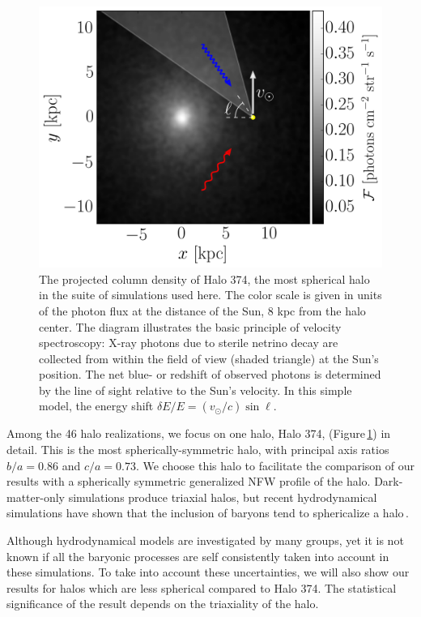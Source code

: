 \documentclass[aps,prd,10pt,twocolumn,superscriptaddress,showpacs]{revtex4-1}
\begin{document}
\begin{figure}[h!]
\centering
\includegraphics[width=0.99\columnwidth]{vspec_diagram.png}
\caption{The projected column density of Halo 374, the most spherical halo in the suite of
	simulations used here. The color scale is given in units of the photon flux at
the distance of the Sun, 8 kpc from the halo center. The diagram illustrates the basic principle of velocity
spectroscopy: X-ray photons due to sterile netrino decay are collected from within the field
of view (shaded triangle) at the Sun's position. The net blue- or redshift of observed photons 
is determined by the line of sight relative to the Sun's velocity. In this simple model, the energy
shift $\delta E/E=(v_\odot/c)\sin\ell$.}
\label{fig:halo374}
\end{figure}


Among the 46 halo realizations, we focus on one halo, Halo 374, (Figure\,\ref{fig:halo374}) in detail. This is the most spherically-symmetric halo, with principal axis ratios $b/a=0.86$ and $c/a=0.73$.  We choose this halo to facilitate the comparison of our results with a spherically symmetric generalized NFW profile of the halo.  Dark-matter-only simulations produce triaxial halos, but recent hydrodynamical simulations have shown that the inclusion of baryons tend to sphericalize a halo\,\cite{Debattista:2007yz,Bryan:2012mw,Bernal:2014mmt,Bernal:2016guq}.

Although hydrodynamical models are investigated by many groups, yet it is not known if all the baryonic processes are self consistently taken into account in these simulations.  To take into account these uncertainties, we will also show our results for halos which are less spherical compared to Halo 374.  The statistical significance of the result depends on the triaxiality of the halo.
\end{document}
